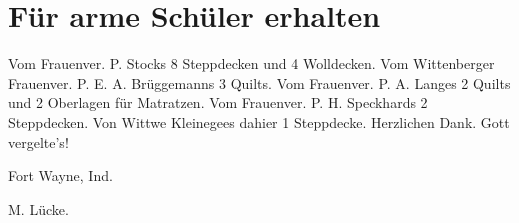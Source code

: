\chapter{Für arme Schüler erhalten}

Vom Frauenver. P. Stocks 8 Steppdecken und 4 Wolldecken. Vom Wittenberger Frauenver. P. E. A. Brüggemanns 3 Quilts. Vom Frauenver. P. A. Langes 2 Quilts und 2 Oberlagen für Matratzen. Vom Frauenver. P. H. Speckhards 2 Steppdecken. Von Wittwe Kleinegees dahier 1 Steppdecke. Herzlichen Dank. Gott vergelte’s!

Fort Wayne, Ind.

M. Lücke.

